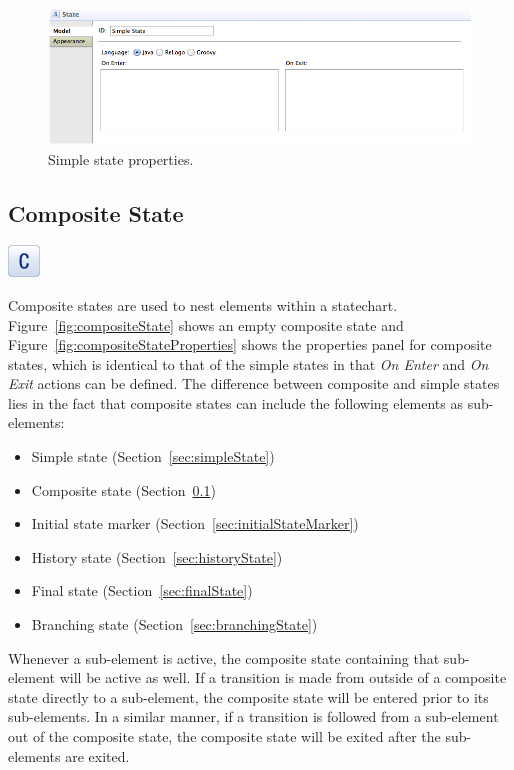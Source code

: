 \documentclass[11pt]{amsart}
\begin{document}
\begin{figure}
\begin{center}
\vspace{.2in}
\centerline {
\includegraphics[width=5in]{StatechartsImages/SimpleStateProperties.png}
}
\caption{Simple state properties.}
\label{fig:simpleStateProperties}
\end{center}
\end{figure}

\clearpage

\subsection{Composite State}
\label{sec:compositeState}
\includegraphics[height=.2in]{StatechartsImages/Composite-State-32.png}

Composite states are used to nest elements within a statechart. Figure~\ref{fig:compositeState} shows an empty composite state and Figure~\ref{fig:compositeStateProperties} shows the properties panel for composite states, which is identical to that of the simple states in that \emph{On Enter} and \emph{On Exit} actions can be defined. The difference between composite and simple states lies in the fact that composite states can include the following elements as sub-elements:
\begin{itemize}
\item Simple state (Section~\ref{sec:simpleState})
\item Composite state (Section~\ref{sec:compositeState})
\item Initial state marker (Section~\ref{sec:initialStateMarker})
\item History state (Section~\ref{sec:historyState})
\item Final state (Section~\ref{sec:finalState})
\item Branching state (Section~\ref{sec:branchingState})
\end{itemize}
Whenever a sub-element is active, the composite state containing that sub-element will be active as well. If a transition is made from outside of a composite state directly to a sub-element, the composite state will be entered prior to its sub-elements. In a similar manner, if a transition is followed from a sub-element out of the composite state, the composite state will be exited after the sub-elements are exited.
\end{document}

